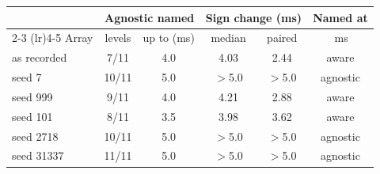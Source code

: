 \begin{tabular}{lccccc}
\toprule
& \multicolumn{2}{c}{Agnostic named} & \multicolumn{2}{c}{Sign change (ms)} & Named at \\
\cmidrule(lr){2-3} \cmidrule(lr){4-5}
Array & levels & up to (ms) & median & paired & \CoarseGapHigh{}\,ms \\
\midrule
as recorded & 7/11 & 4.0 & 4.03 & 2.44 & aware \\
seed 7 & 10/11 & 5.0 & $>$5.0 & $>$5.0 & agnostic \\
seed 999 & 9/11 & 4.0 & 4.21 & 2.88 & aware \\
seed 101 & 8/11 & 3.5 & 3.98 & 3.62 & aware \\
seed 2718 & 10/11 & 5.0 & $>$5.0 & $>$5.0 & agnostic \\
seed 31337 & 11/11 & 5.0 & $>$5.0 & $>$5.0 & agnostic \\
\bottomrule
\end{tabular}
